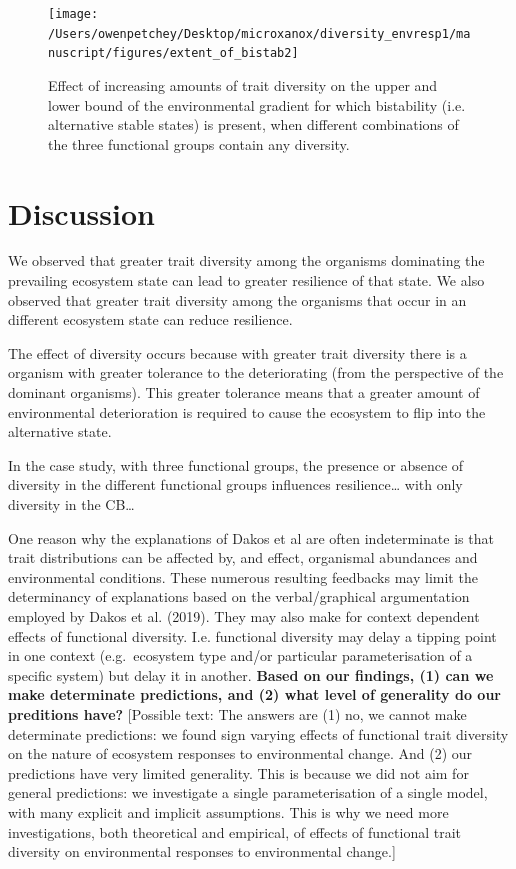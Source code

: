 \documentclass{article}
\begin{document}
\begin{figure}

{\centering \texttt{[image: /Users/owenpetchey/Desktop/microxanox/diversity\_envresp1/manuscript/figures/extent\_of\_bistab2]} 

}

\caption{Effect of increasing amounts of trait diversity on the upper and lower bound of the environmental gradient for which bistability (i.e. alternative stable states) is present, when different combinations of the three functional groups contain any diversity.}\label{fig:stab2}
\end{figure}

\hypertarget{discussion}{%
\section{Discussion}\label{discussion}}

We observed that greater trait diversity among the organisms dominating
the prevailing ecosystem state can lead to greater resilience of that
state. We also observed that greater trait diversity among the organisms
that occur in an different ecosystem state can reduce resilience.

The effect of diversity occurs because with greater trait diversity
there is a organism with greater tolerance to the deteriorating (from
the perspective of the dominant organisms). This greater tolerance means
that a greater amount of environmental deterioration is required to
cause the ecosystem to flip into the alternative state.

In the case study, with three functional groups, the presence or absence
of diversity in the different functional groups influences
resilience\ldots{} with only diversity in the CB\ldots{}

One reason why the explanations of Dakos et al are often indeterminate
is that trait distributions can be affected by, and effect, organismal
abundances and environmental conditions. These numerous resulting
feedbacks may limit the determinancy of explanations based on the
verbal/graphical argumentation employed by Dakos et al. (2019). They may
also make for context dependent effects of functional diversity. I.e.
functional diversity may delay a tipping point in one context
(e.g.~ecosystem type and/or particular parameterisation of a specific
system) but delay it in another. \textbf{Based on our findings, (1) can
we make determinate predictions, and (2) what level of generality do our
preditions have?} {[}Possible text: The answers are (1) no, we cannot
make determinate predictions: we found sign varying effects of
functional trait diversity on the nature of ecosystem responses to
environmental change. And (2) our predictions have very limited
generality. This is because we did not aim for general predictions: we
investigate a single parameterisation of a single model, with many
explicit and implicit assumptions. This is why we need more
investigations, both theoretical and empirical, of effects of functional
trait diversity on environmental responses to environmental change.{]}
\end{document}

